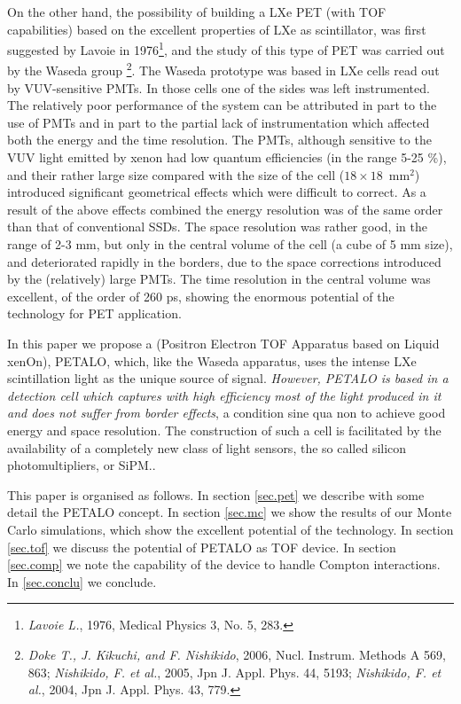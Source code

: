 \documentclass{JINST}
\begin{document}
On the other hand, the possibility of building a LXe PET (with TOF capabilities) based on the excellent properties of LXe as scintillator, was first suggested by Lavoie in 1976\footnote{{\em Lavoie L.}, 1976, Medical Physics 3, No. 5, 283.}, and the study of this type of PET was carried out by the Waseda group \footnote{{\em Doke T., J. Kikuchi, and F. Nishikido}, 2006, 
Nucl. Instrum. Methods A 569, 863;  {\em Nishikido, F. et al.}, 2005, Jpn J. Appl. Phys. 44, 5193; {\em Nishikido, F. et al.}, 2004, Jpn J. Appl. Phys. 43, 779.}. The Waseda prototype was based in LXe cells read out by VUV-sensitive PMTs. In those cells one of the sides was left instrumented. The relatively poor performance of the system can be attributed in part to the use of PMTs and in part to the partial lack of instrumentation which affected both the energy and the time resolution. The PMTs, although sensitive to the VUV light emitted by xenon had low quantum efficiencies (in the range 5-25 \%), and their rather large size compared with the size of the cell ($18\times 18$~mm$^2$) introduced significant geometrical effects which were difficult to correct. As a result of the above effects combined the energy resolution was of the same order than that of conventional SSDs. The space resolution was rather good, in the range of 2-3 mm, but only in the central volume of the cell (a cube of 5 mm size), and deteriorated rapidly in the borders, due to the space corrections introduced by the (relatively) large PMTs. The time resolution in the central volume was excellent, of the order of 260 ps, showing the enormous potential of the technology for PET application. 

In this paper we propose a (Positron Electron TOF Apparatus based on Liquid xenOn), PETALO, which, like the Waseda apparatus, uses the intense LXe scintillation light as the unique source of signal. {\em However, PETALO is based in a detection cell which captures with high efficiency most of the light produced in it and does not suffer from border effects}, a condition sine qua non to achieve good energy and space resolution. The construction of such a cell is facilitated by the availability of a completely new class of light sensors, the so called silicon photomultipliers, or SiPM.. 

This paper is organised as follows. In section \ref{sec.pet} we describe with some detail the PETALO concept. In section \ref{sec.mc} we show the results of our Monte Carlo simulations, which show the excellent potential of the technology. In section \ref{sec.tof} we discuss the potential of PETALO as TOF device. In section \ref{sec.comp} we note the capability of the device to handle Compton interactions. In \ref{sec.conclu} we conclude. 
\end{document}
